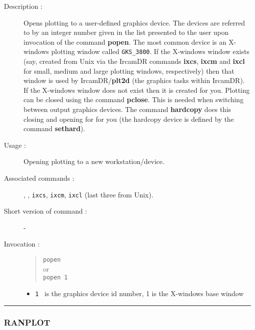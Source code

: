 \begin{description}

\item[Description :] Opens plotting to a user-defined graphics device.
The devices are referred to by an integer number given in the list
presented to the user upon invocation of the command {\bf popen}.  The most
common device is an X-windows plotting window called {\tt GKS\_3800}.
If the X-windows window exists (say, created from Unix via the {\sc
IrcamDR} commands {\bf ixcs}, {\bf ixcm} and {\bf ixcl} for small,
medium and large plotting windows, respectively) then that window is
used by {\sc IrcamDR}/{\bf plt2d} (the graphics tasks within {\sc
IrcamDR}).  If the X-windows window does not exist then it is created
for you.  Plotting can be closed using the command {\bf pclose}.  This
is needed when switching between output graphics devices.  The command
{\bf hardcopy} does this closing and opening for for you (the hardcopy
device is defined by the command {\bf sethard}).

\item[Usage :] Opening plotting to a new workstation/device.
\item[Associated commands :] {\tt {}},
{\tt {}}, {\tt ixcs}, {\tt ixcm}, {\tt ixcl}
(last three from Unix).
\item[Short version of command :] -
\item[Invocation :]

\begin{quote}{\tt  popen }\\
or \\
{\tt popen 1 }
\end{quote}

\begin{itemize}

\item {\tt 1 } is the graphics device id number, 1  is the X-windows
 base window
\end{itemize}

\end{description}

\hrule
\subsubsection*{\label{RANPLOT}RANPLOT}


